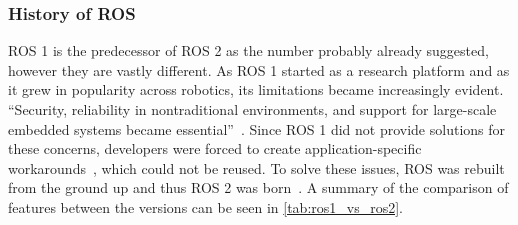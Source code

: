 \documentclass[a4paper]{book}
\begin{document}
\subsubsection{History of ROS}
ROS 1 is the predecessor of ROS 2 as the number probably already suggested,
however they are vastly different. As ROS 1 started as a research platform and
as it grew in popularity across robotics, its limitations became increasingly
evident. \enquote{Security, reliability in nontraditional environments, and
support for large-scale embedded systems became
essential}~\cite{macenski2022robot}. Since ROS 1 did not provide solutions for
these concerns, developers were forced to create application-specific
workarounds~\cite{macenski2022robot}, which could not be reused. To solve these
issues, ROS was rebuilt from the ground up and thus ROS 2 was
born~\cite{macenski2022robot}. A summary of the comparison of features between
the versions can be seen in \cref{tab:ros1_vs_ros2}.
\end{document}
